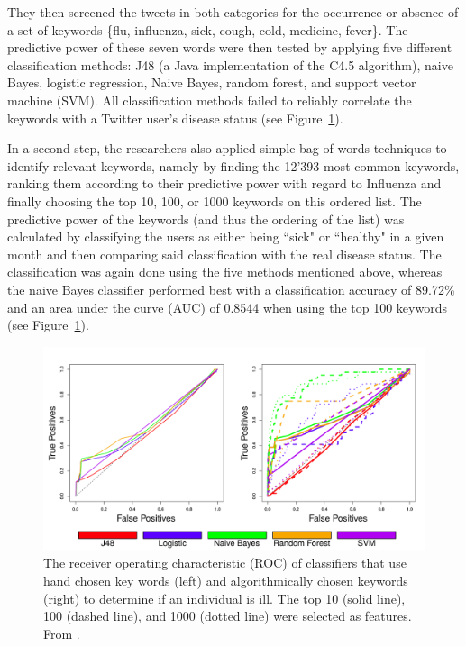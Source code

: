 \documentclass[11pt, a4paper,twoside]{report}\usepackage[]{graphicx}\usepackage[]{color}
\begin{document}
They then screened the tweets in both categories for the occurrence or absence of a set of keywords \{flu, influenza, sick, cough, cold, medicine, fever\}. The predictive power of these seven words were then tested by applying five different classification methods: J48 (a Java implementation of the C4.5 algorithm), naive Bayes, logistic regression, Naive Bayes, random forest, and support vector machine (SVM). All classification methods failed to reliably correlate the keywords with a Twitter user's disease status (see Figure~\ref{fig:ROC_classification_seed}).

In a second step, the researchers also applied simple bag-of-words techniques to identify relevant keywords, namely by finding the 12'393 most common keywords, ranking them according to their predictive power with regard to Influenza and finally choosing the top 10, 100, or 1000 keywords on this ordered list. The predictive power of the keywords (and thus the ordering of the list) was calculated by classifying the users as either being ``sick" or ``healthy" in a given month and then comparing said classification with the real disease status. The classification was again done using the five methods mentioned above, whereas the naive Bayes classifier performed best with a classification accuracy of 89.72\% and an area under the curve (AUC) of 0.8544 when using the top 100 keywords (see Figure~\ref{fig:ROC_classification_seed}).

\begin{figure}[htbp!]
  \centering
    \includegraphics[width=.9\textwidth]{01_ROC_classification_seed.png}
  \caption{The receiver operating characteristic (ROC) of classifiers that use hand chosen key words (left) and algorithmically chosen keywords (right) to determine if an individual is ill. The top 10 (solid line), 100 (dashed line), and 1000 (dotted line) were selected as features. From \cite{bodnar_ground_2014}.}
  \label{fig:ROC_classification_seed}
  \end{figure}
\end{document}
